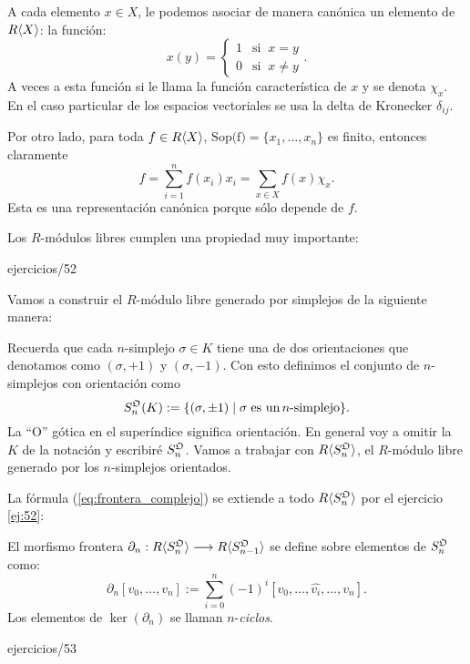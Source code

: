 \documentclass[../../topologia_algebraica]{subfiles}
\begin{document}
\begin{nota}
  A cada elemento $x\in X$, le podemos asociar de manera can\'onica un elemento de $R\langle X \rangle$:
  la funci\'on:
  \[
    x(y)=
      \begin{cases}
        1 & \text{si}\;\; x=y \\
        0 & \text{si}\;\; x\neq y
      \end{cases}.
  \]
  A veces a esta funci\'on si le llama la funci\'on caracter\'istica de $x$ y se denota $\chi_x$. En el caso
  particular de los espacios vectoriales se usa la delta de Kronecker $\delta_{ij}$.

  Por otro lado, para toda $f\in R\langle X \rangle$, $\text{Sop(f)}=\{x_1,\ldots,x_n\}$ es finito, entonces
  claramente
  \[
    f=\sum_{i=1}^n f(x_i)x_i=\sum_{x\in X} f(x)\chi_{x}.
  \]
  Esta es una representaci\'on can\'onica porque s\'olo depende de $f$.
\end{nota}

Los $R$-m\'odulos libres cumplen una propiedad muy importante:

{ejercicios/52} %

Vamos a construir el $R$-m\'odulo libre generado por simplejos de la siguiente manera:

Recuerda que cada $n$-simplejo $\sigma\in K$ tiene una de dos orientaciones que denotamos como
$(\sigma,+1)$ y $(\sigma,-1)$. Con esto definimos el conjunto de $n$-simplejos con orientaci\'on como
\[
	S_n^{\mathfrak{O}}(K):=\{(\sigma,\pm 1)\mid \sigma\;\text{es un}\,n\text{-simplejo}\}.
\]
La ``O'' g\'otica en el super\'indice significa orientaci\'on.
En general voy a omitir la $K$ de la notaci\'on y escribir\'e $S_n^{\mathfrak{O}}$. Vamos a trabajar con
$R\langle S_n^{\mathfrak{O}} \rangle$, el $R$-m\'odulo libre generado por los $n$-simplejos orientados.

La f\'ormula (\ref{eq:frontera_complejo}) se extiende a todo $R\langle S_n^{\mathfrak{O}} \rangle$ por el ejercicio
\ref{ej:52}:

\begin{defin}
	El morfismo frontera $\partial_n:R\langle S_n^{\mathfrak{O}} \rangle\longrightarrow R\langle S_{n-1}^{\mathfrak{O}} \rangle$ se define sobre elementos
	de $S_n^{\mathfrak{O}}$ como:
	\[
		\partial_n[v_0,\ldots,v_n]:=\sum_{i=0}^n(-1)^i[v_0,\ldots,\hat{v_i},\ldots,v_n].
	\]
	Los elementos de $\ker(\partial_n)$ se llaman $n$-\emph{ciclos}.
\end{defin}

{ejercicios/53}  %
\end{document}
